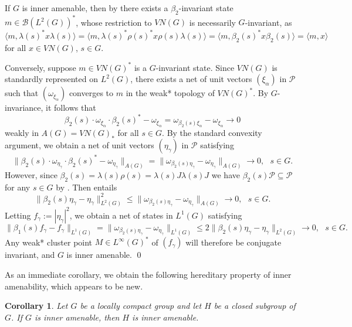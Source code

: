 \documentclass[preprint,12pt]{elsarticle}
\newtheorem{cor}[thm]{Corollary}
\newcommand{\mc}[1]{\mathcal{#1}}
\newcommand{\la}{\langle}
\newcommand{\ra}{\rangle}
\newcommand{\LG}{VN(G)}
\newcommand{\LO}{L^1(G)}
\newcommand{\LT}{L^2(G)}
\newcommand{\LI}{L^{\infty}(G)}
\newcommand{\BLT}{\mc{B}(L^2(G))}
\newcommand{\lm}{\lambda}
\newcommand{\om}{\omega}
\providecommand{\norm}[1]{\lVert#1\rVert}
\begin{document}
\begin{pf} If $G$ is inner amenable, then by \cite[Theorem 2.4]{Bekka} there exists a $\beta_2$-invariant state $m\in\BLT^*$, whose restriction to $\LG$ is necessarily $G$-invariant, as
$$\la m,\lm(s)^*x\lm(s)\ra=\la m,\lm(s)^*\rho(s)^*x\rho(s)\lm(s)\ra=\la m,\beta_2(s)^*x\beta_2(s)\ra=\la m,x\ra$$
for all $x\in VN(G)$, $s\in G.$

Conversely, suppose $m\in \LG^*$ is a $G$-invariant state. Since $\LG$ is standardly represented on $\LT$, there exists a net of unit vectors $(\xi_\alpha)$ in $\mc{P}$ such that $(\om_{\xi_\alpha})$ converges to $m$ in the weak* topology of $\LG^*$. By $G$-invariance, it follows that
\begin{equation*}\beta_2(s)\cdot\om_{\xi_\alpha}\cdot\beta_2(s)^*-\om_{\xi_\alpha}=\om_{\beta_2(s)\xi_\alpha}-\om_{\xi_\alpha}\rightarrow 0\end{equation*}
weakly in $A(G)=\LG_*$ for all $s\in G$. By the standard convexity argument, we obtain a net of unit vectors $(\eta_\gamma)$ in $\mc{P}$ satisfying
\begin{equation*}\norm{\beta_2(s)\cdot\om_{\eta_\gamma}\cdot\beta_2(s)^*-\om_{\eta_\gamma}}_{A(G)}=\norm{\om_{\beta_2(s)\eta_\gamma}-\om_{\eta_\gamma}}_{A(G)}\rightarrow 0, \ \ \ s\in G.\end{equation*}
However, since $\beta_2(s)=\lm(s)\rho(s)=\lm(s)J\lm(s)J$ we have $\beta_2(s)\mc{P}\subseteq\mc{P}$ for any $s\in G$ by \cite[Theorem 1.1]{H}. Then \cite[Lemma 2.10]{H} entails
\begin{equation*}\norm{\beta_2(s)\eta_\gamma-\eta_\gamma}_{\LT}^2\leq\norm{\om_{\beta_2(s)\eta_\gamma}-\om_{\eta_\gamma}}_{A(G)}\rightarrow0, \ \ \ s\in G.\end{equation*}
Letting $f_\gamma:=|\eta_\gamma|^2$, we obtain a net of states in $\LO$ satisfying
$$\norm{\beta_1(s)f_\gamma - f_\gamma}_{\LO}=\norm{\om_{\beta_2(s)\eta_\gamma}-\om_{\eta_\gamma}}_{\LO}\leq 2\norm{\beta_2(s)\eta_\gamma - \eta_\gamma}_{\LT}\rightarrow0, \ \ \ s\in G.$$
Any weak* cluster point $M\in\LI^*$ of $(f_\gamma)$ will therefore be conjugate invariant, and $G$ is inner amenable.
\qed\end{pf}

As an immediate corollary, we obtain the following hereditary property of inner amenability, which appears to be new.

\begin{cor}\label{c:subgroup} Let $G$ be a locally compact group and let $H$ be a closed subgroup of $G$. If $G$ is inner amenable, then $H$ is inner amenable.
\end{cor}
\end{document}
